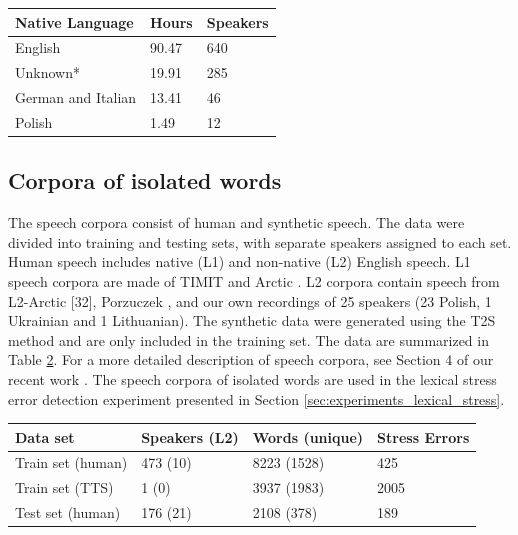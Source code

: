 \documentclass[]{interact}
\theoremstyle{plain}%
\theoremstyle{definition}
\theoremstyle{remark}
\begin{document}
\begin{table}
{
  \centering
  \begin{tabular}{lll}
    \toprule  
   Native Language & Hours & Speakers \\
    \midrule
    English & 90.47 & 640\\ 
    Unknown* & 19.91 & 285\\  
    German and Italian & 13.41 & 46\\  
    Polish & 1.49 & 12\\ 
    \bottomrule
  \end{tabular}
  }
    \label{tab:weaklys_speech_corpora}
\end{table}

\subsection{Corpora of isolated words}
\label{sec:speech_corpora_words}

The speech corpora consist of human and synthetic speech. The data were divided into training and testing sets, with separate speakers assigned to each set. Human speech includes native (L1) and non-native (L2) English speech. L1 speech corpora are made of TIMIT \cite{garofolo1993darpa} and Arctic \cite{kominek2004cmu}. L2 corpora contain speech from L2-Arctic [32], Porzuczek \cite{porzuczek2017english}, and our own recordings of 25 speakers (23 Polish, 1 Ukrainian and 1 Lithuanian). The synthetic data were generated using the T2S method and are only included in the training set. The data are summarized in Table \ref{tab:lexical_stress_speech_corpora_traintest}. For a more detailed description of speech corpora, see Section 4 of our recent work \cite{korzekwa21_interspeech}. The speech corpora of isolated words are used in the lexical stress error detection experiment presented in Section \ref{sec:experiments_lexical_stress}.

\begin{table}
 {
\begin{tabular}{llll}
    \toprule  
    Data set  & Speakers  (L2) & Words (unique) &  Stress Errors \\
    \midrule
    Train set (human) & 473 (10) & 8223 (1528) & 425\\
    Train set (TTS) & 1 (0) & 3937 (1983) & 2005\\
    Test set (human) & 176 (21) & 2108 (378) & 189\\
    \bottomrule
  \end{tabular}
 }
  \label{tab:lexical_stress_speech_corpora_traintest}
\end{table}
\end{document}
